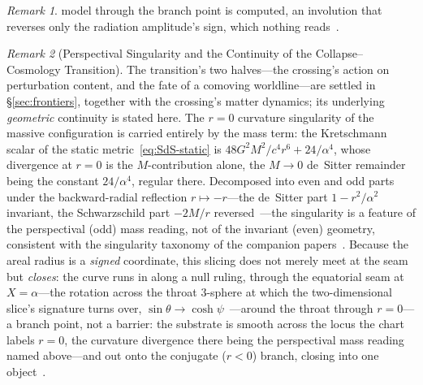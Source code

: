 \documentclass[11pt,a4paper]{article}
\theoremstyle{plain}
\theoremstyle{definition}
\theoremstyle{remark}
\newtheorem{remark}{Remark}
\begin{document}
\begin{remark}
model through the branch point is computed, an involution that reverses only the radiation amplitude's sign, which nothing reads~\cite{JanzenCosmogenesis}.
\end{remark}

\begin{remark}[Perspectival Singularity and the Continuity of the Collapse--Cosmology Transition]\label{rem:twolevels}
The transition's two halves---the crossing's action on perturbation content, and the fate of a comoving worldline---are settled in \S\ref{sec:frontiers}, together with the crossing's matter dynamics; its underlying \emph{geometric} continuity is stated here. The $r=0$ curvature singularity of the massive configuration is carried entirely by the mass term: the Kretschmann scalar of the static metric~\eqref{eq:SdS-static} is $48G^2M^2/c^4r^6+24/\alpha^4$, whose divergence at $r=0$ is the $M$-contribution alone, the $M\to0$ de~Sitter remainder being the constant $24/\alpha^4$, regular there. Decomposed into even and odd parts under the backward-radial reflection $r\mapsto-r$---the de~Sitter part $1-r^2/\alpha^2$ invariant, the Schwarzschild part $-2M/r$ reversed~\cite{JanzenGroupoid}---the singularity is a feature of the perspectival (odd) mass reading, not of the invariant (even) geometry, consistent with the singularity taxonomy of the companion papers~\cite{JanzenBHcausality,JanzenCircle}. Because the areal radius is a \emph{signed} coordinate, this slicing does not merely meet at the seam but \emph{closes}: the curve runs in along a null ruling, through the equatorial seam at $X=\alpha$---the rotation across the throat $3$-sphere at which the two-dimensional slice's signature turns over, $\sin\theta\to\cosh\psi$~\cite{JanzenSlicing,JanzenThesis}---around the throat through $r=0$---a branch point, not a barrier: the substrate is smooth across the locus the chart labels $r=0$, the curvature divergence there being the perspectival mass reading named above---and out onto the conjugate ($r<0$) branch, closing into one object~\cite{JanzenSlicing}.


\end{remark}
\end{document}
